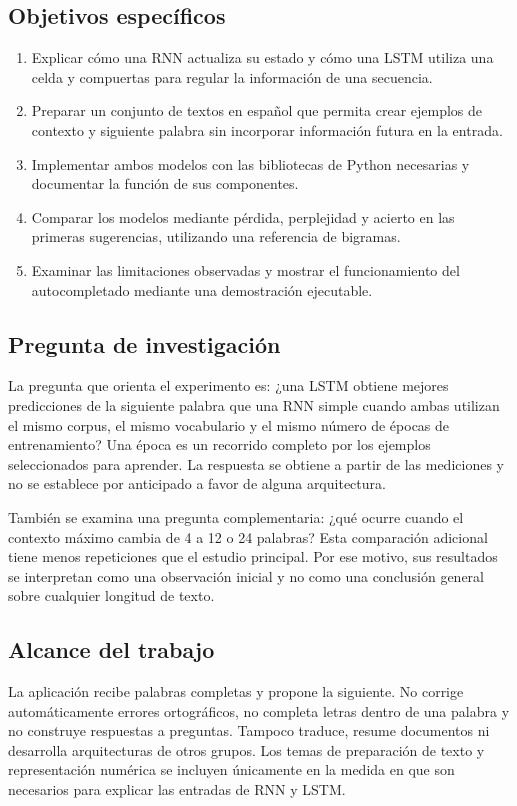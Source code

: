 \subsection{Objetivos específicos}
\begin{enumerate}
\item Explicar cómo una RNN actualiza su estado y cómo una LSTM utiliza una celda y compuertas para regular la información de una secuencia.
\item Preparar un conjunto de textos en español que permita crear ejemplos de contexto y siguiente palabra sin incorporar información futura en la entrada.
\item Implementar ambos modelos con las bibliotecas de Python necesarias y documentar la función de sus componentes.
\item Comparar los modelos mediante pérdida, perplejidad y acierto en las primeras sugerencias, utilizando una referencia de bigramas.
\item Examinar las limitaciones observadas y mostrar el funcionamiento del autocompletado mediante una demostración ejecutable.
\end{enumerate}

\subsection{Pregunta de investigación}
La pregunta que orienta el experimento es: ¿una LSTM obtiene mejores predicciones de la siguiente palabra que una RNN simple cuando ambas utilizan el mismo corpus, el mismo vocabulario y el mismo número de épocas de entrenamiento? Una época es un recorrido completo por los ejemplos seleccionados para aprender. La respuesta se obtiene a partir de las mediciones y no se establece por anticipado a favor de alguna arquitectura.

También se examina una pregunta complementaria: ¿qué ocurre cuando el contexto máximo cambia de 4 a 12 o 24 palabras? Esta comparación adicional tiene menos repeticiones que el estudio principal. Por ese motivo, sus resultados se interpretan como una observación inicial y no como una conclusión general sobre cualquier longitud de texto.

\subsection{Alcance del trabajo}
La aplicación recibe palabras completas y propone la siguiente. No corrige automáticamente errores ortográficos, no completa letras dentro de una palabra y no construye respuestas a preguntas. Tampoco traduce, resume documentos ni desarrolla arquitecturas de otros grupos. Los temas de preparación de texto y representación numérica se incluyen únicamente en la medida en que son necesarios para explicar las entradas de RNN y LSTM.


